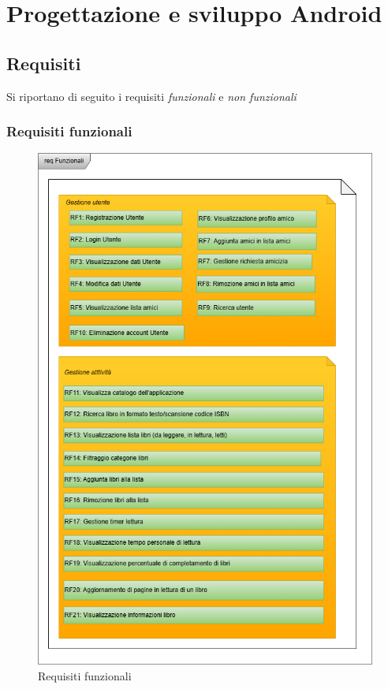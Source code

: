\documentclass{article}
\begin{document}
\section{Progettazione e sviluppo Android}

\subsection{Requisiti}
Si riportano di seguito i requisiti \textit{funzionali} e \textit{non funzionali}
\subsubsection{Requisiti funzionali}

\begin{figure}[H]
  \centering
  \includegraphics[width=.9\linewidth]{req_funzionali.png}
  \caption{Requisiti funzionali}
  \label{fig:sitemap}
\end{figure}
\end{document}
